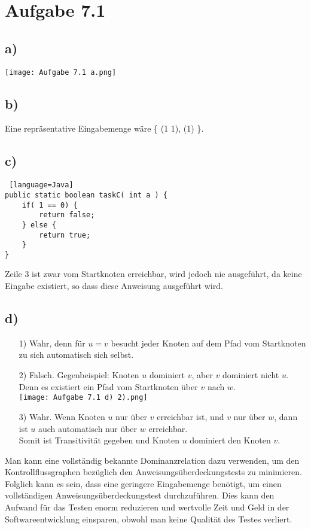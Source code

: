\documentclass[a4paper,11pt]{scrartcl}
\begin{document}
    \section*{Aufgabe 7.1}
		\subsection*{a)}
			\texttt{[image: Aufgabe 7.1 a.png]}
		\subsection*{b)} Eine repräsentative Eingabemenge wäre \{ (1 1), (1) \}.

		\subsection*{c)}
\begin{lstlisting} [language=Java]
public static boolean taskC( int a ) {
	if( 1 == 0) {
		return false;
	} else {
		return true;
	}
}
\end{lstlisting}
			Zeile 3 ist zwar vom Startknoten erreichbar, wird jedoch nie ausgeführt, da keine Eingabe existiert,
			so dass diese Anweisung ausgeführt wird.
		\subsection*{d)}
			\begin{enumerate}
				\item[1)] Wahr, denn für $u = v$ besucht jeder Knoten auf dem Pfad vom Startknoten zu sich 
							automatisch sich selbst.
				\item[2)] Falsch. Gegenbeispiel: Knoten $u$ dominiert $v$, aber $v$ dominiert nicht $u$. Denn es
							existiert ein Pfad vom Startknoten über $v$ nach $w$. \\
							\texttt{[image: Aufgabe 7.1 d) 2).png]} 
				\item[3)]  Wahr. Wenn Knoten $u$ nur über $v$ erreichbar ist, und $v$ nur über $w$, dann ist
							$u$ auch automatisch nur über $w$ erreichbar.\\
							Somit ist Transitivität gegeben und Knoten $u$ dominiert den Knoten $v$.  
			\end{enumerate}
		
			Man kann eine vollständig bekannte Dominanzrelation dazu verwenden, um den Kontrollflussgraphen
			bezüglich den Anweisungsüberdeckungstests zu minimieren. Folglich kann es sein, dass eine geringere
			Eingabemenge benötigt, um einen vollständigen Anweisungsüberdeckungstest durchzuführen. Dies kann den
			Aufwand für das Testen enorm reduzieren und wertvolle Zeit und Geld in der Softwareentwicklung einsparen,
			obwohl man keine Qualität des Testes verliert.
		
\end{document}
